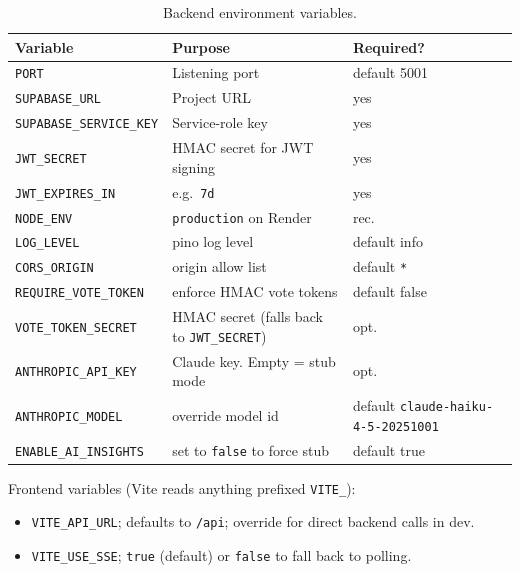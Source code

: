 \begin{table}[ht]
  \centering
  \caption{Backend environment variables.}\label{tab:env}
  \begin{tabularx}{\linewidth}{lXl}
    \toprule
    \textbf{Variable} & \textbf{Purpose} & \textbf{Required?} \\
    \midrule
    \texttt{PORT}               & Listening port              & default 5001 \\
    \texttt{SUPABASE\_URL}      & Project URL                  & yes \\
    \texttt{SUPABASE\_SERVICE\_KEY} & Service-role key          & yes \\
    \texttt{JWT\_SECRET}        & HMAC secret for JWT signing  & yes \\
    \texttt{JWT\_EXPIRES\_IN}   & e.g.\ \texttt{7d}            & yes \\
    \texttt{NODE\_ENV}          & \texttt{production} on Render & rec. \\
    \texttt{LOG\_LEVEL}         & pino log level               & default info \\
    \texttt{CORS\_ORIGIN}       & origin allow list            & default \texttt{*} \\
    \texttt{REQUIRE\_VOTE\_TOKEN} & enforce HMAC vote tokens    & default false \\
    \texttt{VOTE\_TOKEN\_SECRET}& HMAC secret (falls back to \texttt{JWT\_SECRET}) & opt. \\
    \texttt{ANTHROPIC\_API\_KEY}& Claude key. Empty = stub mode & opt. \\
    \texttt{ANTHROPIC\_MODEL}   & override model id            & default \texttt{claude-haiku-4-5-20251001} \\
    \texttt{ENABLE\_AI\_INSIGHTS} & set to \texttt{false} to force stub & default true \\
    \bottomrule
  \end{tabularx}
\end{table}

Frontend variables (Vite reads anything prefixed \texttt{VITE\_}):

\begin{itemize}[leftmargin=*]
  \item \texttt{VITE\_API\_URL}; defaults to \texttt{/api}; override
        for direct backend calls in dev.
  \item \texttt{VITE\_USE\_SSE}; \texttt{true} (default) or
        \texttt{false} to fall back to polling.
\end{itemize}

